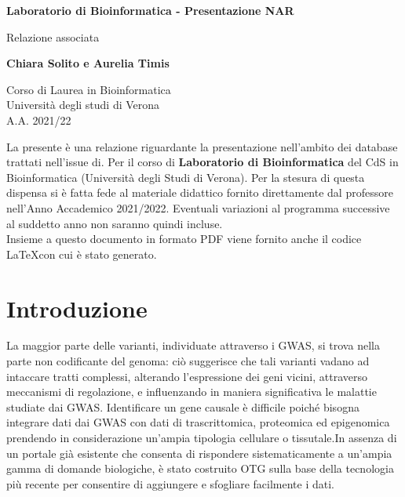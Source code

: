 \documentclass{article}
\begin{document}
\newcommand\tab[1][0.3cm]{\hspace*{#1}}


\begin{titlepage}
    \begin{center}
        \vspace*{1cm}
            
        \Huge
        \textbf{Laboratorio di Bioinformatica - Presentazione NAR}
            
        \vspace{0.5cm}
        \LARGE
        Relazione associata
            
        \vspace{1.5cm}
            
        \textbf{Chiara Solito e Aurelia Timis}

        \vspace{0.8cm}

            
        \Large
        Corso di Laurea in Bioinformatica\\
        Università degli studi di Verona\\
        A.A. 2021/22
            
    \end{center}
\end{titlepage}
La presente è una relazione riguardante la presentazione nell'ambito dei database trattati nell'issue di. Per il corso di \textbf{Laboratorio di Bioinformatica} del CdS in Bioinformatica (Università degli Studi di Verona). Per la stesura di questa dispensa si è fatta fede al materiale didattico fornito direttamente dal professore nell'Anno Accademico 2021/2022. Eventuali variazioni al programma successive al suddetto anno non saranno quindi incluse.\\
Insieme a questo documento in formato PDF viene fornito anche il codice \LaTeX  con cui è stato generato.
\tableofcontents
\thispagestyle{empty}
\newpage
\thispagestyle{empty}
\section{Introduzione}
La maggior parte delle varianti, individuate attraverso i GWAS, si trova nella parte non codificante del genoma: ciò suggerisce che tali varianti vadano ad intaccare tratti complessi, alterando l'espressione dei geni vicini, attraverso meccanismi di regolazione, e influenzando in maniera significativa le malattie studiate dai GWAS. 
Identificare un gene causale è difficile poiché bisogna integrare dati dai GWAS con dati di trascrittomica, proteomica ed epigenomica prendendo in considerazione un'ampia tipologia cellulare o tissutale.In assenza di un portale già esistente che consenta di rispondere sistematicamente a un'ampia gamma di domande biologiche, è stato costruito OTG sulla base della tecnologia più recente per consentire di aggiungere e sfogliare facilmente i dati. 
\end{document}
